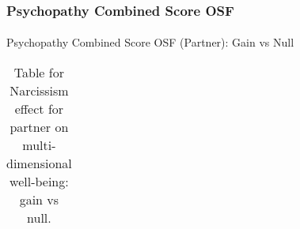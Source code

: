 \documentclass[
  singlecolumn]{article}
\makeatletter
\let\oldparagraph\paragraph
\renewcommand{\paragraph}{
    \@ifstar
      \xxxParagraphStar
      \xxxParagraphNoStar
  }
\newcommand{\xxxParagraphStar}[1]{\oldparagraph*{#1}\mbox{}}
\newcommand{\xxxParagraphNoStar}[1]{\oldparagraph{#1}\mbox{}}
\makeatother
\begin{document}
\subsubsection{Psychopathy Combined Score
OSF}\label{psychopathy-combined-score-osf}

\paragraph{Psychopathy Combined Score OSF (Partner): Gain vs
Null}\label{psychopathy-combined-score-osf-partner-gain-vs-null}

\begin{longtable}[]{@{}
  >{\raggedright\arraybackslash}p{}
  >{\raggedleft\arraybackslash}p{}
  >{\raggedleft\arraybackslash}p{}
  >{\raggedleft\arraybackslash}p{}
  >{\raggedleft\arraybackslash}p{}
  >{\raggedleft\arraybackslash}p{}@{}}

\caption{\label{tbl-results-psychopathy_combined_partner-null-gain-osf}Table
for Narcissism effect for partner on multi-dimensional well-being: gain
vs null.}

\tabularnewline


\end{longtable}
\end{document}
